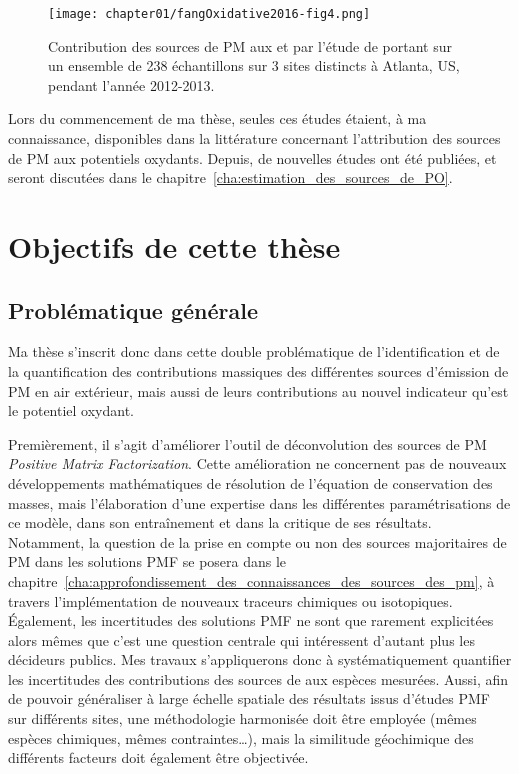 \begin{figure}[ht]
    \centering
    \texttt{[image: chapter01/fangOxidative2016-fig4.png]}
    \caption{Contribution des sources de PM aux \POAAv{} et \PODTTv{} par l'étude de
    \cite{fangOxidative2016} portant sur un ensemble de 238 échantillons sur 3 sites
        distincts à Atlanta, US, pendant l'année 2012-2013.}%
    \label{fig:chapter01/fangOxidative2016-fig4}
\end{figure}

Lors du commencement de ma thèse, seules ces études étaient, à ma connaissance,
disponibles dans la littérature concernant l'attribution des sources de PM aux potentiels
oxydants.  Depuis, de nouvelles études ont été publiées, et seront discutées dans le
chapitre~\ref{cha:estimation_des_sources_de_PO}.


\section{Objectifs de cette thèse}%
\label{sec:positionnement_de_cette_thèse}

\subsection{Problématique générale}%
\label{sub:problématique_générale}

Ma thèse s'inscrit donc dans cette double problématique de l'identification et de la
quantification des contributions massiques des différentes sources d'émission de PM en air
extérieur, mais aussi de leurs contributions au nouvel indicateur qu'est le potentiel
oxydant.

Premièrement, il s'agit d'améliorer l'outil de déconvolution des sources de PM
\textit{Positive Matrix Factorization}. Cette amélioration ne concernent pas de nouveaux
développements mathématiques de résolution de l'équation de conservation des masses, mais
l'élaboration d'une expertise dans les différentes paramétrisations de ce modèle, dans son
entraînement et dans la critique de ses résultats.
Notamment, la question de la prise en compte ou non des sources majoritaires de PM dans
les solutions PMF se posera dans le
chapitre~\ref{cha:approfondissement_des_connaissances_des_sources_des_pm}, à travers
l'implémentation de nouveaux traceurs chimiques ou isotopiques.
Également, les incertitudes des solutions PMF ne sont que rarement explicitées alors
mêmes que c'est une question centrale qui intéressent d'autant plus les décideurs publics.
Mes travaux s'appliquerons donc à systématiquement quantifier les incertitudes des
contributions des sources de \PMdix{} aux espèces mesurées.
Aussi, afin de pouvoir généraliser à large échelle spatiale des résultats issus d'études
PMF sur différents sites, une méthodologie harmonisée doit être employée (mêmes espèces
chimiques, mêmes contraintes…), mais la similitude géochimique des différents facteurs
doit également être objectivée.

